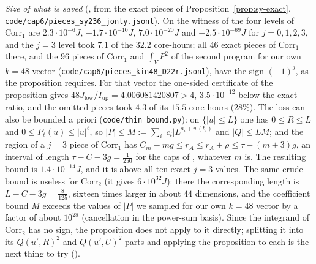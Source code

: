 \begin{sloppypar}\noindent\emph{Size of what is saved} (, from the exact pieces
of Proposition~\ref{prop:sy-exact}, \texttt{code/cap6/pieces\_sy236\_jonly.jsonl}).
On the witness of \cite{SY26} the four levels of $\mathrm{Corr}_1$ are
$2.3\cdot10^{-6}J$, $-1.7\cdot10^{-10}J$, $7.0\cdot10^{-20}J$ and
$-2.5\cdot10^{-69}J$ for $j=0,1,2,3$, and the $j=3$ level took $7.1$ of the
$32.2$ core-hours; all $46$ exact pieces of $\mathrm{Corr}_1$ there, and the
$96$ pieces of $\mathrm{Corr}_1$ and $\int_VP^2$ of the second program
for our own $k=48$ vector (\texttt{code/cap6/pieces\_kin48\_D22r.jsonl}), have
the sign $(-1)^j$, as the proposition requires. For that vector the one-sided
certificate of the proposition gives $48J_{\mathrm{low}}/I_{\mathrm{up}}=4.006081420807>4$,
$3.5\cdot10^{-12}$ below the exact ratio, and the omitted pieces took $4.3$ of
its $15.5$ core-hours ($28\%$). The loss can also be bounded a
priori (\texttt{code/thin\_bound.py}): on $\{|u|\le L\}$ one has
$0\le R\le L$ and $0\le P_\ell(u)\le|u|^\ell$, so $|P|\le M:=\sum_i|c_i|L^{a_i+w(b_i)}$
and $|Q|\le LM$; and the region of a $j=3$ piece of $\mathrm{Corr}_1$ has
$C_m-mg\le r_A\le r_A+\rho\le\tau-(m+3)g$, an interval of length
$\tau-C-3g=\frac{1}{250}$ for the caps of \cite{Kin26,SY26}, whatever $m$ is.
The resulting bound is $1.4\cdot10^{-14}J$, and it is above all ten exact
$j=3$ values. The same crude bound is useless for $\mathrm{Corr}_2$ (it gives
$6\cdot10^{32}J$): there the corresponding length is
$L-C-3g=\frac{8}{125}$, sixteen times larger in about $44$ dimensions, and the
coefficient bound $M$ exceeds the values of $|P|$ we sampled for our own
$k=48$ vector by a factor of about $10^{28}$ (cancellation in the power-sum basis). Since the integrand of
$\mathrm{Corr}_2$ has no sign, the proposition does not apply to it directly;
splitting it into its $Q(u',R)^2$ and $Q(u',U)^2$ parts and applying the
proposition to each is the next thing to try ().
\end{sloppypar}

